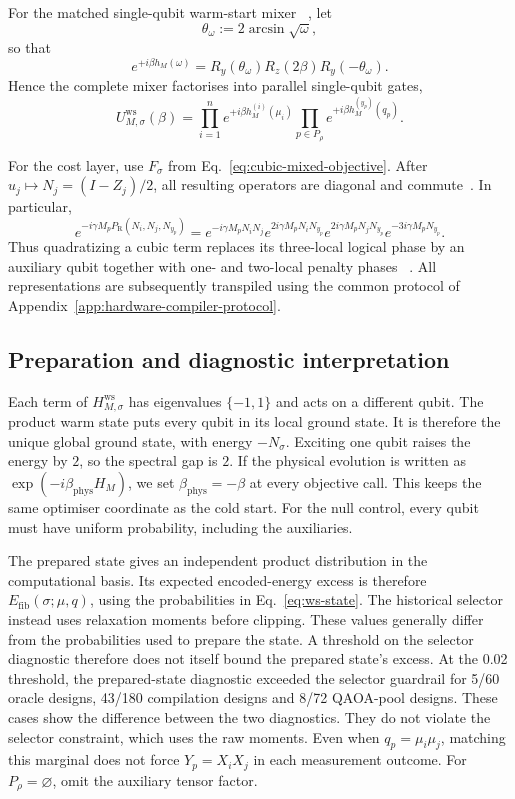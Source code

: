 \documentclass[a4paper,onecolumn,11pt,unpublished]{quantumarticle}
\theoremstyle{remark}
\begin{document}
For the matched single-qubit warm-start mixer
~\cite{Egger2021,TateCustom2023}, let
\[
\theta_\omega:=2\arcsin\sqrt{\omega},
\]
so that
\[
e^{+i\beta h_M(\omega)}
=
R_y(\theta_\omega)
R_z(2\beta)
R_y(-\theta_\omega).
\]
Hence the complete mixer factorises into parallel single-qubit gates,
\[
U_{M,\sigma}^{\mathrm{ws}}(\beta)
=
\prod_{i=1}^n e^{+i\beta h_M^{(i)}(\mu_i)}
\prod_{p\in P_\rho}e^{+i\beta h_M^{(y_p)}(q_p)}.
\]

For the cost layer, use $F_\sigma$ from Eq.~\eqref{eq:cubic-mixed-objective}.
After $u_j\mapsto N_j=(I-Z_j)/2$, all resulting operators are diagonal and
commute~\cite{Hadfield2021,CampbellDahl2022}.  In particular,
\[
e^{-i\gamma M_p P_{\mathrm R}(N_i,N_j,N_{y_p})}
=
e^{-i\gamma M_pN_iN_j}
e^{2i\gamma M_pN_iN_{y_p}}
e^{2i\gamma M_pN_jN_{y_p}}
e^{-3i\gamma M_pN_{y_p}}.
\]
Thus quadratizing a cubic term replaces its three-local logical phase by an
auxiliary qubit together with one- and two-local penalty phases
~\cite{Schmidbauer2024,Schmidbauer2026}.  All
representations are subsequently transpiled using the common protocol of
Appendix~\ref{app:hardware-compiler-protocol}.

\subsection{Preparation and diagnostic interpretation}
Each term of $H_{M,\sigma}^{\mathrm{ws}}$ has eigenvalues $\{-1,1\}$
and acts on a different qubit. The product warm state puts every qubit in
its local ground state. It is therefore the unique global ground state,
with energy $-N_\sigma$. Exciting one qubit raises the energy by $2$, so
the spectral gap is $2$.
If the physical evolution is written as $\exp(-i\beta_{\mathrm{phys}}H_M)$,
we set $\beta_{\mathrm{phys}}=-\beta$ at every objective call. This keeps
the same optimiser coordinate as the cold start. For the null control,
every qubit must have uniform probability, including the auxiliaries.

The prepared state gives an independent product distribution in the
computational basis. Its expected encoded-energy excess is therefore
\(E_{\mathrm{fib}}(\sigma;\mu,q)\), using the probabilities in
Eq.~\eqref{eq:ws-state}. The historical selector instead uses relaxation
moments before clipping. These values generally differ from the probabilities
used to prepare the state. A threshold on the selector diagnostic therefore
does not itself bound the prepared state's excess.
At the 0.02 threshold, the prepared-state diagnostic exceeded the selector
guardrail for 5/60 oracle designs, 43/180 compilation designs and 8/72
QAOA-pool designs. These cases show the difference between the two
diagnostics. They do not violate the selector constraint, which uses the
raw moments. Even when \(q_p=\mu_i\mu_j\), matching this marginal does not
force \(Y_p=X_iX_j\) in each measurement outcome.
For \(P_\rho=\varnothing\), omit the auxiliary tensor factor.
\end{document}
